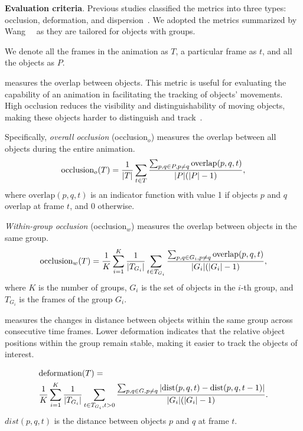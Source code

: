 \noindent\textbf{Evaluation criteria}. 
Previous studies classified the metrics into three types: occlusion, deformation, and dispersion~\cite{chevalier2014not, dragicevic2011distortion, du2015trajectory, wang2017vector}.
We adopted the metrics summarized by Wang~\etal~\cite{wang2017vector} as they are tailored for objects with groups.



We denote all the frames in the animation as $T$, a particular frame as $t$, and
all the objects as $P$.

 measures the overlap between objects.
This metric is useful for evaluating the capability of an animation in facilitating the tracking of objects' movements.
High occlusion reduces the visibility and distinguishability of moving objects, making these objects harder to distinguish and track~\cite{chevalier2014not,dragicevic2011distortion}.


Specifically, \textit{overall occlusion} (occlusion$_o$) measures the overlap between all objects during the entire animation.
\begin{equation}
\text{occlusion}_o(T) = \notag \frac{1}{|T|} \sum_{t \in T} \frac{\sum_{p,q \in P, p\neq q} \text{overlap}(p, q, t)}{|P|(|P| - 1)},
\end{equation}
where $\text{overlap}(p, q, t)$ is an indicator function with value 1 if objects $p$ and $q$ overlap at frame $t$, and 0 otherwise.

\textit{Within-group occlusion} (occlusion$_w$) measures the overlap between objects in the same group.
\begin{equation}
\begin{aligned}
\text{occlusion}_w(T) = \notag \frac{1}{K}\sum_{i=1}^{K}\frac{1}{|T_{G_i}|} \sum_{t \in T_{G_i}} \frac{\sum_{p,q \in G_i, p\neq q} \text{overlap}(p, q, t)}{|G_i|(|G_i|-1)},
\end{aligned}
\end{equation}
where $K$ is the number of groups, $G_i$ is the set of objects in the $i$-th group, and $T_{G_i}$ is the frames of the group $G_{i}$.


 measures the changes in distance between objects within the same group across consecutive time frames.
Lower deformation indicates that the relative object positions within the group remain stable, making it easier to track the objects of interest.

\begin{equation}
\begin{aligned}
& \text{deformation}(T) =  \notag \\
& \frac{1}{K} \sum_{i=1}^{K} \frac{1}{|T_{G_i}|} 
 \sum_{t \in T_{G_i}, t > 0}
 \frac{\sum_{p, q \in G, p \neq q} |\text{dist}(p, q, t) - \text{dist}(p, q, t - 1)|}{|G_i| (|G_i| - 1)}.
\end{aligned}
\end{equation}
$dist(p, q, t)$ is the distance between objects $p$ and $q$ at frame $t$.

